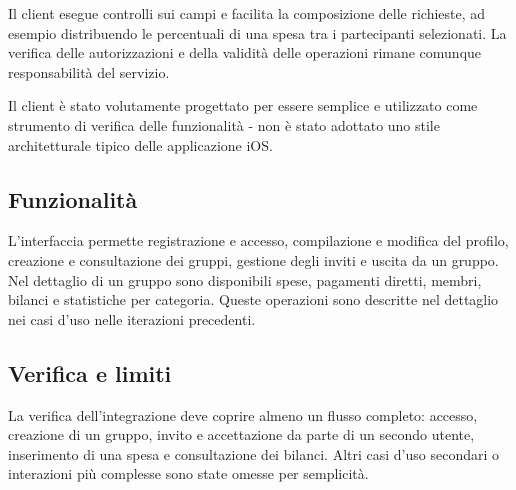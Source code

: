 Il client esegue controlli sui campi e facilita la composizione delle richieste, ad esempio distribuendo le percentuali di una spesa tra i partecipanti selezionati. La verifica delle autorizzazioni e della validità delle operazioni rimane comunque responsabilità del servizio.

Il client è stato volutamente progettato per essere semplice e utilizzato come strumento di verifica delle funzionalità - non è stato adottato uno stile architetturale tipico delle applicazione iOS.

\subsection{Funzionalità}
L'interfaccia permette registrazione e accesso, compilazione e modifica del profilo, creazione e consultazione dei gruppi, gestione degli inviti e uscita da un gruppo. Nel dettaglio di un gruppo sono disponibili spese, pagamenti diretti, membri, bilanci e statistiche per categoria. Queste operazioni sono descritte nel dettaglio nei casi d'uso nelle iterazioni precedenti.

\subsection{Verifica e limiti}
La verifica dell'integrazione deve coprire almeno un flusso completo: accesso, creazione di un gruppo, invito e accettazione da parte di un secondo utente, inserimento di una spesa e consultazione dei bilanci.
Altri casi d'uso secondari o interazioni più complesse sono state omesse per semplicità.